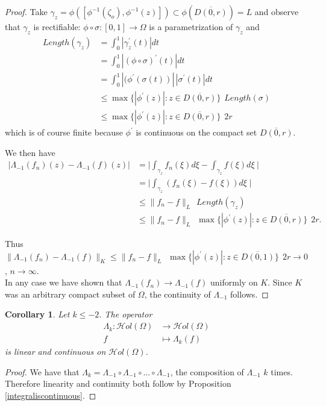 \documentclass[11pt,twoside,a4paper]{article}
\newtheorem{corollary}[theorem]{Corollary}
\theoremstyle{remark}
\newcommand{\hol}{{\mathcal Hol}}
\begin{document}
\begin{proof}
 Take $\gamma_z= \phi([\phi^{-1}(\zeta_o),\phi^{-1}(z)])\subset \phi(\overline{D(0,r)})=L$ and observe that $\gamma_z$ is rectifiable: $\phi \circ \sigma :[0,1]\longrightarrow \Omega $ is a parametrization of $\gamma_z$ and
 \begin{align*}
 Length(\gamma_z)&= \int_{0}^{1} |\gamma_{z}^{'}(t)|dt \\ &= \int_{0}^{1}|(\phi \circ \sigma)^{'}(t)|dt \\
 &= \int_{0}^{1}|(\phi ^{'}(\sigma(t))|\hspace{2pt}|\sigma ^{'}(t)|dt  \\
 & \leq \max \big\{|\phi ^{'}(z)|: z \in \overline{D(0,r)} \big\}  \hspace{5pt}
  Length(\sigma) \\
  & \leq \max \big\{|\phi ^{'}(z)|: z \in \overline{D(0,r)} \big\}  \hspace{5pt} 2r
 \end{align*}
 which is of course finite because $\phi ^{'}$ is continuous on the compact set $\overline{D(0,r)}$.
 \par
 We then have
 \begin{align*}
   |\Lambda_{-1}(f_n)(z)-\Lambda_{-1}(f)(z)| &= \big| \int_{\gamma_z}f_n(\xi)d\xi-\int_{\gamma_z}f(\xi)d\xi \hspace{3pt}\big| \\
   & = \big|\int_{\gamma_z}(f_n(\xi)-f(\xi))d\xi \hspace{3pt}\big|\\
    & \leq \|f_n-f\|_L \hspace{5pt} Length(\gamma_z)\\
    & \leq \|f_n-f\|_L \hspace{5pt} \max \big\{|\phi ^{'}(z)|: z \in \overline{D(0,r)} \big\}  \hspace{5pt} 2r .
 \end{align*}

  Thus $\|\Lambda_{-1}(f_n)-\Lambda_{-1}(f)\|_K \leq \|f_n-f\|_L \hspace{5pt} \max \big\{|\phi ^{'}(z)|: z \in \overline{D(0,1)} \big\}  \hspace{5pt} 2r \longrightarrow 0 $, $n\rightarrow \infty$.\\
  In any case we have shown that $\Lambda_{-1}(f_n)\longrightarrow \Lambda_{-1}(f)$ uniformly on $K$. Since $K$ was an arbitrary compact subset of $\Omega$, the continuity of $\Lambda_{-1}$ follows.
  \end{proof}
\begin{corollary}
\label{kprimitiveiscont}
  Let $k \leq -2$. The operator
  \begin{align*}
  \Lambda_{k}: \hol(\Omega)&\longrightarrow \hol(\Omega)\\
  f& \mapsto \Lambda_k(f)
  \end{align*}
  is linear and continuous on $\hol(\Omega)$.
\end{corollary}
\begin{proof}
We have that $\Lambda_k = \Lambda_{-1} \circ \Lambda_{-1} \circ ... \circ \Lambda_{-1}$, the composition of $\Lambda_{-1}$ $k$ times. Therefore linearity and continuity both follow by Proposition \ref{integraliscontinuous}.
\end{proof}
\end{document}
